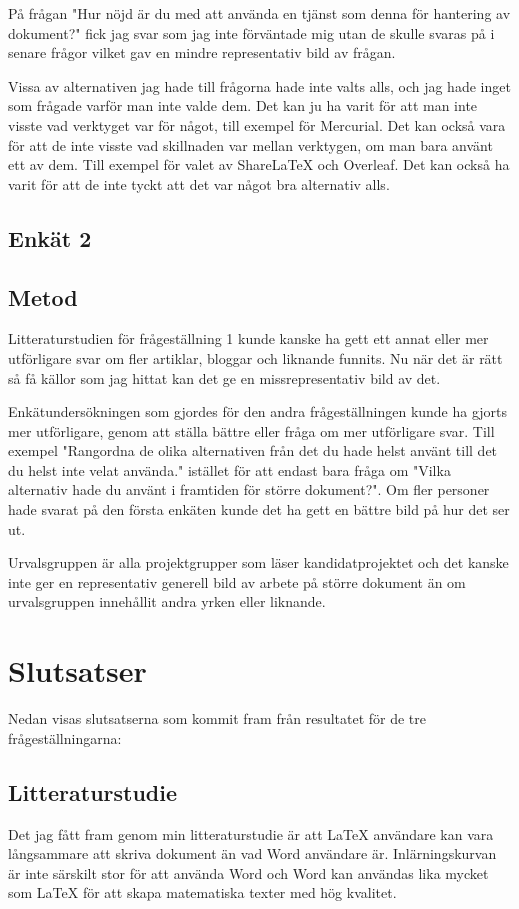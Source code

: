 På frågan "Hur nöjd är du med att använda en tjänst som denna för hantering av dokument?" fick jag svar som jag inte förväntade mig utan de skulle svaras på i senare frågor vilket gav en mindre representativ bild av frågan.

Vissa av alternativen jag hade till frågorna hade inte valts alls, och jag hade inget som frågade varför man inte valde dem. Det kan ju ha varit för att man inte visste vad verktyget var för något, till exempel för Mercurial. Det kan också vara för att de inte visste vad skillnaden var mellan verktygen, om man bara använt ett av dem. Till exempel för valet av ShareLaTeX och Overleaf. Det kan också ha varit för att de inte tyckt att det var något bra alternativ alls. 


\subsection{Enkät 2}

\subsection{Metod}
Litteraturstudien för frågeställning 1 kunde kanske ha gett ett annat eller mer utförligare svar om fler artiklar, bloggar och liknande funnits. Nu när det är rätt så få källor som jag hittat kan det ge en missrepresentativ bild av det.

Enkätundersökningen som gjordes för den andra frågeställningen kunde ha gjorts mer utförligare, genom att ställa bättre eller fråga om mer utförligare svar. Till exempel "Rangordna de olika alternativen från det du hade helst använt till det du helst inte velat använda." istället för att endast bara fråga om "Vilka alternativ hade du använt i framtiden för större dokument?". Om fler personer hade svarat på den första enkäten kunde det ha gett en bättre bild på hur det ser ut.

Urvalsgruppen är alla projektgrupper som läser kandidatprojektet och det kanske inte ger en representativ generell bild av arbete på större dokument än om urvalsgruppen innehållit andra yrken eller liknande.

\section{Slutsatser}
\label{sec:conclusions-tuhkala}
Nedan visas slutsatserna som kommit fram från resultatet för de tre frågeställningarna:

\subsection{Litteraturstudie}
Det jag fått fram genom min litteraturstudie är att LaTeX användare kan vara långsammare att skriva dokument än vad Word användare är. Inlärningskurvan är inte särskilt stor för att använda Word och Word kan användas lika mycket som LaTeX för att skapa matematiska texter med hög kvalitet.

